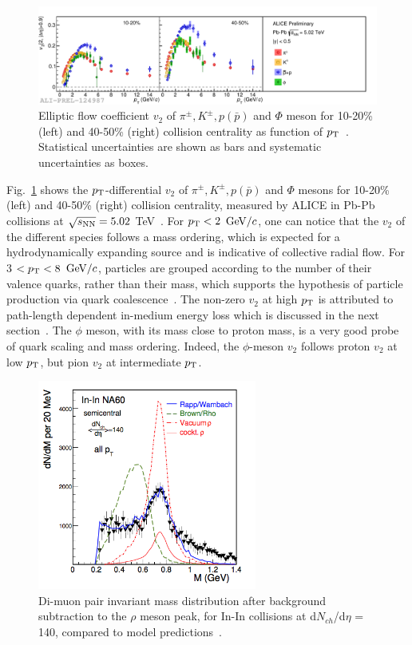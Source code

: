 \begin{figure}[!ht]
  \centering
  \includegraphics[width=15cm]{FigCap1/v2IdentifiedParticles.pdf}
  \caption{Elliptic flow coefficient $v_2$ of $\pi^{\pm}, K^{\pm}, p(\bar{p})$ and $\Phi$ meson for 10-20\% (left) and 40-50\% (right)
collision centrality as function of $p_{\rm T}$~\cite{Bertens:2017krr}. Statistical uncertainties are shown as bars and systematic uncertainties as boxes.}
  \label{fig:v2IdentifiedParticles}
\end{figure}
Fig.~\ref{fig:v2IdentifiedParticles} shows the $p_{\rm T}$-differential 
$v_2$ of $\pi^{\pm}, K^{\pm}, p(\bar{p})$ and $\Phi$ mesons for 10-20\% (left)
and 40-50\% (right) collision centrality, measured by 
ALICE in Pb-Pb collisions at $\sqrt{s_{\rm NN}} = 5.02$ TeV~\cite{Bertens:2017krr}.
For $p_{\rm T} < 2$ $\mathrm{GeV}/c$, one can notice that the $v_2$ of the different species
 follows a mass ordering, which is expected for a hydrodynamically expanding 
 source and is indicative of collective radial flow.
For 3 $< p_{\rm T} < 8$ $\mathrm{GeV}/c$, particles are grouped according to the number of their valence
 quarks, rather than their mass, which supports the
hypothesis of particle production via quark coalescence~\cite{Molnar:2003ff}. 
The non-zero $v_2$ at high $p_{\rm T}$ is attributed to path-length dependent 
in-medium energy loss which is discussed in the next section~\cite{Gyulassy:2000gk}. The $\phi$ meson, 
with its mass close to proton mass, is a very good probe of quark scaling and 
mass ordering. Indeed, the $\phi$-meson $v_2$ follows proton $v_2$ at low 
$p_{\rm T}$, but pion $v_2$ at intermediate $p_{\rm T}$. \\

\label{sec:ChiralSymm}
\begin{figure}[!ht]
  \centering
  \includegraphics[width=7.2cm]{FigCap1/rhoMelting.png}
  \caption{Di-muon pair invariant mass distribution after 
background subtraction to the $\rho$ meson peak, for In-In collisions at d$N_{ch}$/d$\eta$ = 140, compared to model predictions~\cite{Rapp:2012zq}.}
  \label{fig:rhoMelting}
\end{figure}
